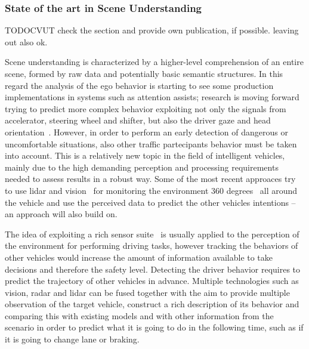 

\subsubsection{State of the art in Scene Understanding}

TODOCVUT check the section and provide own publication, if possible. leaving out also ok.

Scene understanding is characterized by a higher-level comprehension of an entire scene, formed by raw data and potentially basic semantic structures.
In this regard the analysis of the ego behavior is starting to see some production implementations in systems such as attention assists; research is moving forward trying to predict more complex behavior exploiting not only the signals from accelerator, steering wheel and shifter, but also the driver gaze and head orientation~\cite{unipr-Doshi09onthe}. 
However, in order to perform an early detection of dangerous or uncomfortable situations, also other traffic partecipants behavior must be taken into account. This is a relatively new topic in the field of intelligent vehicles, mainly due to the high demanding perception and processing requirements needed to assess results in a robust way. Some of the most recent approaces try to use lidar and vision~\cite{unipr-5274065,unipr-4114350} for monitoring the environment 360 degrees~\cite{unipr-iav2010-braive} all around the vehicle and use the perceived data to predict the other vehicles intentions -- an approach \Project{} will also build on.

The idea of exploiting a rich sensor suite~\cite{unipr-Bertozzi_equipmentand} is usually applied to the perception of the environment for performing driving tasks, however tracking the behaviors of other vehicles would increase the amount of information available to take decisions and therefore the safety level. Detecting the driver behavior requires to predict the trajectory of other vehicles in advance. Multiple technologies such as vision, radar and lidar can be fused together with the aim to provide multiple observation of the target vehicle, construct a rich description of its behavior and comparing this with existing models and with other information from the scenario in order to predict what it is going to do in the following time, such as if it is going to change lane or braking. 

